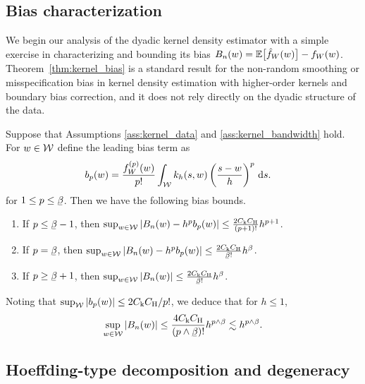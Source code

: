 \subsection{Bias characterization}
\label{sec:kernel_bias}

We begin our analysis of the dyadic kernel density estimator with a simple
exercise in characterizing and bounding its bias
$B_n(w) = \mathbb{E} \big[ \hat f_W(w) \big] - f_W(w)$.
Theorem~\ref{thm:kernel_bias} is a standard result for the
non-random smoothing or misspecification bias in kernel density estimation with
higher-order kernels and boundary bias correction, and it does not rely
directly on the dyadic structure of the data.

\begin{theorem}
  \label{thm:kernel_bias}

  Suppose that Assumptions \ref{ass:kernel_data} and \ref{ass:kernel_bandwidth}
  hold. For $w \in \mathcal{W}$ define the leading bias term as
  \begin{align*}
    b_p(w)
    &=
    \frac{f_W^{(p)}(w)}{p!}
    \int_{\mathcal{W}}
    k_h(s,w)
    \left(
      \frac{s-w}{h}
    \right)^p
    \,\mathrm{d}s.
  \end{align*}
  for $1 \leq p \leq \flbeta$. Then we have the following bias bounds.
  \begin{enumerate}[label=(\roman*)]
    \item If $p \leq \flbeta - 1$, then
      $\sup_{w \in \mathcal{W}} | B_n(w) - h^p b_p(w) |
      \leq \frac{2 C_{\mathrm{k}} C_{\mathrm{H}}}{(p+1)!} h^{p+1}$.

    \item If $p = \flbeta$, then
      $\sup_{w \in \cW} | B_n(w) - h^p b_p(w) |
      \leq \frac{2 C_\rk C_\rH}{\flbeta !} h^\beta$.

    \item If $p \geq \flbeta+1$, then
      $\sup_{w \in \cW} | B_n(w) |
      \leq \frac{2 C_\rk C_\rH}{\flbeta !} h^\beta$.
  \end{enumerate}
  Noting that $\sup_{\mathcal{W}} |b_p(w)| \leq 2 C_{\mathrm{k}} C_{\mathrm{H}} / p!$,
  we deduce that for $h \leq 1$,
  \begin{align*}
    \sup_{w \in \cW} | B_n(w) |
    \leq
    \frac{4 C_\rk C_\rH}{(p \wedge \flbeta)!}
    h^{p \wedge \beta}
    \lesssim
    h^{p \wedge \beta}.
  \end{align*}

\end{theorem}

\subsection{Hoeffding-type decomposition and degeneracy}
\label{sec:degeneracy}

